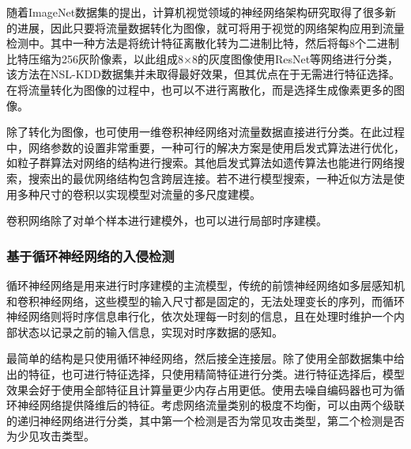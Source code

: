 随着ImageNet\cite{10.1109/CVPR.2009.5206848}数据集的提出，计算机视觉领域的神经网络架构研究取得了很多新的进展，因此只要将流量数据转化为图像，就可将用于视觉的网络架构应用到流量检测中。其中一种方法是将统计特征离散化转为二进制比特，然后将每8个二进制比特压缩为256灰阶像素，以此组成8×8的灰度图像使用ResNet等网络进行分类，该方法在NSL-KDD\cite{10.1109/CISDA.2009.5356528}数据集并未取得最好效果，但其优点在于无需进行特征选择\cite{10.1007/978-3-319-70139-4_87}。在将流量转化为图像的过程中，也可以不进行离散化，而是选择生成像素更多的图像\cite{PMID:34138657}。

除了转化为图像，也可使用一维卷积神经网络对流量数据直接进行分类。在此过程中，网络参数的设置非常重要，一种可行的解决方案是使用启发式算法进行优化，如粒子群算法对网络的结构进行搜索\cite{10.1016/j.ins.2021.03.060}。其他启发式算法如遗传算法也能进行网络搜索，搜索出的最优网络结构包含跨层连接\cite{10.1016/j.future.2020.07.042}。若不进行模型搜索，一种近似方法是使用多种尺寸的卷积以实现模型对流量的多尺度建模\cite{10.1016/j.future.2021.10.018}。

卷积网络除了对单个样本进行建模外，也可以进行局部时序建模\cite{10.7717/peerj-cs.721}。
\subsubsection{基于循环神经网络的入侵检测}
循环神经网络是用来进行时序建模的主流模型，传统的前馈神经网络如多层感知机和卷积神经网络，这些模型的输入尺寸都是固定的，无法处理变长的序列，而循环神经网络则将时序信息串行化，依次处理每一时刻的信息，且在处理时维护一个内部状态以记录之前的输入信息，实现对时序数据的感知。

最简单的结构是只使用循环神经网络，然后接全连接层\cite{10.1109/ICCSP48568.2020.9182099}。除了使用全部数据集中给出的特征，也可进行特征选择，只使用精简特征进行分类\cite{10.1016/j.comcom.2022.12.010,10.1016/j.icte.2020.03.002}。进行特征选择后，模型效果会好于使用全部特征且计算量更少内存占用更低\cite{10.1016/j.comnet.2023.109662}。使用去噪自编码器也可为循环神经网络提供降维后的特征\cite{XAXB202302002}。考虑网络流量类别的极度不均衡，可以由两个级联的递归神经网络进行分类，其中第一个检测是否为常见攻击类型，第二个检测是否为少见攻击类型\cite{10.1016/j.simpat.2019.102031}。

